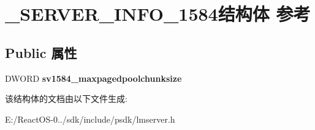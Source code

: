 \hypertarget{struct___s_e_r_v_e_r___i_n_f_o__1584}{}\section{\+\_\+\+S\+E\+R\+V\+E\+R\+\_\+\+I\+N\+F\+O\+\_\+1584结构体 参考}
\label{struct___s_e_r_v_e_r___i_n_f_o__1584}
\subsection*{Public 属性}
\begin{DoxyCompactItemize}
\item 
\mbox{\label{struct___s_e_r_v_e_r___i_n_f_o__1584_a92b32a0297d25f74ffa49cb9a330ba86}} 
D\+W\+O\+RD {\bfseries sv1584\+\_\+maxpagedpoolchunksize}
\end{DoxyCompactItemize}


该结构体的文档由以下文件生成\+:\begin{DoxyCompactItemize}
\item 
E\+:/\+React\+O\+S-\/0../sdk/include/psdk/lmserver.\+h\end{DoxyCompactItemize}
